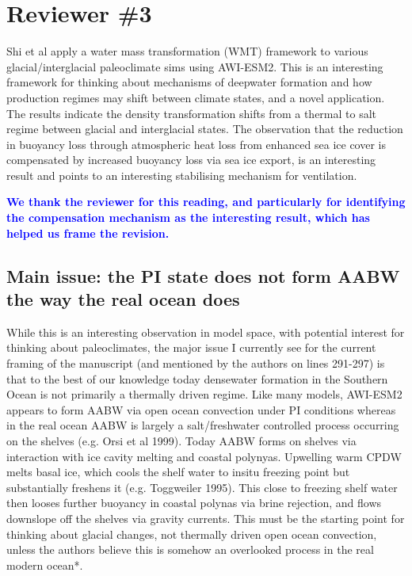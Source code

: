 \documentclass[pdflatex,sn-nature]{sn-jnl}
\begin{document}
\clearpage
\section*{Reviewer \#3}

\medskip
\noindent Shi et al apply a water mass transformation (WMT) framework to various glacial/interglacial paleoclimate sims using AWI-ESM2. This is an interesting framework for thinking about mechanisms of deepwater formation and how production regimes may shift between climate states, and a novel application. The results indicate the density transformation shifts from a thermal to salt regime between glacial and interglacial states. The observation that the reduction in buoyancy loss through atmospheric heat loss from enhanced sea ice cover is compensated by increased buoyancy loss via sea ice export, is an interesting result and points to an interesting stabilising mechanism for ventilation.
\medskip

\noindent\textcolor{blue}{\textbf{We thank the reviewer for this reading, and particularly for identifying the compensation mechanism as the interesting result, which has helped us frame the revision.}}


\subsection*{Main issue: the PI state does not form AABW the way the real ocean does}

\medskip
\noindent While this is an interesting observation in model space, with potential interest for thinking about paleoclimates, the major issue I currently see for the current framing of the manuscript (and mentioned by the authors on lines 291-297) is that to the best of our knowledge today densewater formation in the Southern Ocean is not primarily a thermally driven regime. Like many models, AWI-ESM2 appears to form AABW via open ocean convection under PI conditions whereas in the real ocean AABW is largely a salt/freshwater controlled process occurring on the shelves (e.g. Orsi et al 1999). Today AABW forms on shelves via interaction with ice cavity melting and coastal polynyas. Upwelling warm CPDW melts basal ice, which cools the shelf water to insitu freezing point but substantially freshens it (e.g. Toggweiler 1995). This close to freezing shelf water then looses further buoyancy in coastal polynas via brine rejection, and flows downslope off the shelves via gravity currents. This must be the starting point for thinking about glacial changes, not thermally driven open ocean convection, unless the authors believe this is somehow an overlooked process in the real modern ocean*.
\medskip
\end{document}

